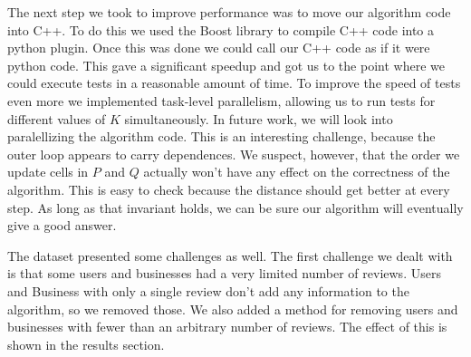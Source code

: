 The next step we took to improve performance was to move our algorithm code into
C++. To do this we used the Boost library to compile C++ code into a python
plugin. Once this was done we could call our C++ code as if it were python code.
This gave a significant speedup and got us to the point where we could execute
tests in a reasonable amount of time. To improve the speed of tests even more we
implemented task-level parallelism, allowing us to run tests for different
values of $K$ simultaneously. In future work, we will look into paralellizing
the algorithm code. This is an interesting challenge, because the outer loop
appears to carry dependences. We suspect, however, that the order we update
cells in $P$ and $Q$ actually won't have any effect on the correctness of the
algorithm. This is easy to check because the distance should get better at every
step. As long as that invariant holds, we can be sure our algorithm will
eventually give a good answer.

The dataset presented some challenges as well. The first challenge we dealt with
is that some users and businesses had a very limited number of reviews. Users
and Business with only a single review don't add any information to the
algorithm, so we removed those. We also added a method for removing users and
businesses with fewer than an arbitrary number of reviews. The effect of this is
shown in the results section.
